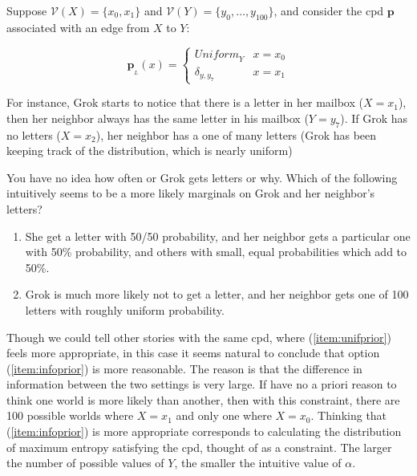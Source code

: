 \documentclass{article}
\theoremstyle{plain}
\theoremstyle{definition}
\theoremstyle{remark}
\newcommand\mat[1]{\mathbf{#1}}
\newcommand{\bp}[1][L]{\mat{p}_{\!_{#1}\!}}
\newcommand{\V}{\mathcal V}
\numberwithin{equation}{section}
\begin{document}
{	\begin{example}\label{ex:alpha-motivation}
		Suppose $\V(X) = \{x_0, x_1\}$ and $\V(Y) = \{y_0,
                \ldots, y_{100}\}$, and consider the cpd $\mat p$
                associated with an edge from $X$ to $Y$: 
		
		\begin{equation}
			\bp(x) = \begin{cases}
				\mathit{Uniform}_Y & x = x_0 \\
				\delta_{y, y_7} & x = x_1
			\end{cases}
		\end{equation}

		For instance, Grok starts to notice that there is a letter in her mailbox ($X = x_1$), then her neighbor always has the same letter in his mailbox ($Y = y_7$). If Grok has no letters ($X = x_2$), her neighbor has a one of many letters (Grok has been keeping track of the distribution, which is nearly uniform)
		
		You have no idea how often or Grok gets letters or why. Which of the following intuitively seems to be a more likely marginals on Grok and her neighbor's letters?
		
		\begin{enumerate}
			\item She get a letter with 50/50 probability, and her neighbor gets a particular one with 50\% probability, and others with small, equal probabilities which add to 50\%. \label{item:unifprior}
			\item Grok is much more likely not to get a letter, and her neighbor gets one of 100 letters with roughly uniform probability. \label{item:infoprior}
		\end{enumerate}
		 	
				
		Though we could tell other stories with the same cpd,
                where (\ref{item:unifprior}) feels more appropriate,
                in this case it seems natural to conclude that option
                (\ref{item:infoprior}) is more reasonable. The reason
                is that the difference in information between the two
                settings is very large. If have no a priori reason to
                think one world is more likely than another, then with
                this constraint, there are 100 possible worlds where
                 $X = x_1$ and only one where $X = x_0$. Thinking that
                (\ref{item:infoprior}) is more appropriate corresponds
                to calculating the distribution of maximum entropy
                satisfying the cpd, thought of as a constraint. The
                larger the number of possible values of $Y$, the
                smaller the intuitive value of $\alpha$. 


\end{example}}
\end{document}
